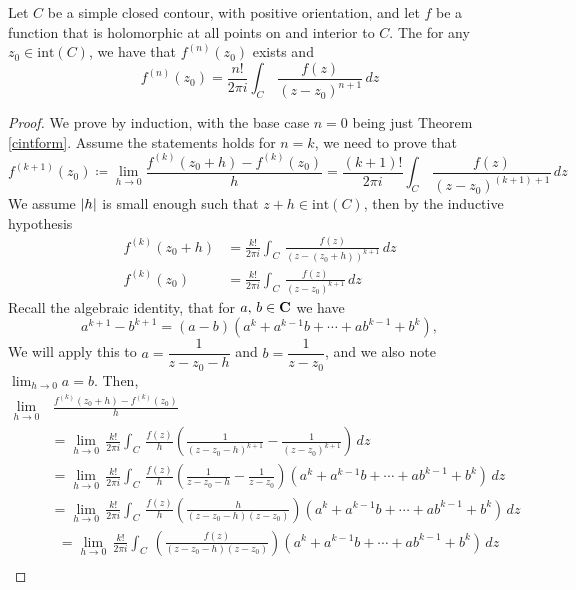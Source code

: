 \medskip

\begin{theorem}\label{gencintform}
Let $C$ be a simple closed contour, with positive orientation, and let $f$ be a function that is holomorphic at all points on and interior to $C$. The for any $z_0 \in \mathrm{int}(C)$, we have that $f^{(n)}(z_0)$ exists and
\[f^{(n)}(z_0) = \frac{n!}{2\pi i}\int_C\,\frac{f(z)}{(z - z_0)^{n+1}}\,dz\]
\end{theorem}
\begin{proof}
We prove by induction, with the base case $n = 0$ being just Theorem \ref{cintform}. Assume the statements holds for $n = k$, we need to prove  that
\[f^{(k+1)}(z_0) \coloneqq \lim_{h \to 0}\frac{f^{(k)}(z_0 + h) - f^{(k)}(z_0)}{h} = \frac{(k+1)!}{2\pi i}\int_C\,\frac{f(z)}{(z - z_0)^{(k+1)+1}}\,dz\]
We assume $\left\lvert h\right\rvert$ is small enough such that $z + h \in \mathrm{int}(C)$, then by the inductive hypothesis
\begin{align*}
f^{(k)}(z_0 + h) &= \frac{k!}{2\pi i}\int_C\,\frac{f(z)}{(z - (z_0 + h))^{k+1}}\,dz\\[1em]
f^{(k)}(z_0) &= \frac{k!}{2\pi i}\int_C\,\frac{f(z)}{(z - z_0)^{k+1}}\,dz
\end{align*}
Recall the algebraic identity, that for $a,\,b \in \mathbf C$ we have
\[a^{k+1} - b^{k+1} = (a - b)(a^k + a^{k-1}b + \cdots + ab^{k-1} + b^k),\]
We will apply this to $a = \dfrac{1}{z - z_0 - h}$ and $b = \dfrac{1}{z - z_0}$, and we also note $\lim_{h \to 0}a = b$. Then,
\begin{align*}
\lim_{h \to 0}&\,\frac{f^{(k)}(z_0 + h) - f^{(k)}(z_0)}{h}\\[1em]
&= \lim_{h \to 0}\,\frac{k!}{2\pi i}\int_C\,\frac{f(z)}{h}\left(\frac{1}{(z - z_0 - h)^{k+1}} - \frac{1}{(z - z_0)^{k+1}}\right)\,dz\\[1em]
 &= \lim_{h \to 0}\,\frac{k!}{2\pi i}\int_C\,\frac{f(z)}{h}\left(\frac{1}{z - z_0 - h} - \frac{1}{z - z_0}\right)(a^k + a^{k-1}b + \cdots + ab^{k-1} + b^k)\,dz \\[1em]
 &= \lim_{h \to 0}\,\frac{k!}{2\pi i}\int_C\,\frac{f(z)}{h}\left(\frac{h}{(z - z_0 - h)(z - z_0)}\right)(a^k + a^{k-1}b + \cdots + ab^{k-1} + b^k)\,dz%
\end{align*}
\begin{align*}
 \phantom{\lim_{h \to 0}} &= \lim_{h \to 0}\,\frac{k!}{2\pi i}\int_C\,\left(\frac{f(z)}{(z - z_0 - h)(z - z_0)}\right)(a^k + a^{k-1}b + \cdots + ab^{k-1} + b^k)\,dz \\[1em]

\end{align*}
\end{proof}
